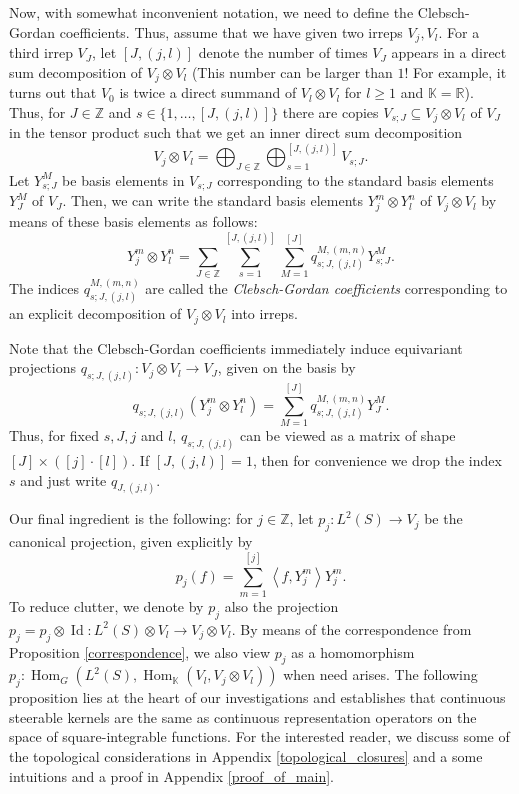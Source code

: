 \documentclass[12pt, a4paper]{article}
\theoremstyle{plain}
\theoremstyle{definition}
\theoremstyle{remark}
\newcommand{\Z}{\mathds{Z}}
\newcommand{\R}{\mathds{R}}
\newcommand{\K}{\mathds{K}}
\DeclareMathOperator{\Hom}{Hom}
\DeclareMathOperator{\Id}{Id}
\begin{document}
Now, with somewhat inconvenient notation, we need to define the Clebsch-Gordan coefficients. Thus, assume that we have given two irreps $V_j, V_l$. For a third irrep $V_J$, let $[J,(j,l)]$ denote the number of times $V_J$ appears in a direct sum decomposition of $V_j \otimes V_l$ (This number can be larger than $1$! For example, it turns out that $V_0$ is twice a direct summand of $V_l \otimes V_l$ for $l \geq 1$ and $\K = \R$). Thus, for $J \in \Z$ and $s \in \{1, \dots, [J,(j,l)]\}$ there are copies $V_{s;J} \subseteq V_j \otimes V_l$ of $V_J$ in the tensor product such that we get an inner direct sum decomposition
\begin{equation*}
V_j \otimes V_l = \bigoplus_{J \in \Z} \bigoplus_{s = 1}^{[J,(j,l)]} V_{s;J}.
\end{equation*}
Let $Y_{s;J}^M$ be basis elements in $V_{s;J}$ corresponding to the standard basis elements $Y_{J}^M$ of $V_J$. Then, we can write the standard basis elements $Y_j^m \otimes Y_l^n$ of $V_j \otimes V_l$ by means of these basis elements as follows:
\begin{equation*}
Y_j^m \otimes Y_l^n = \sum_{J \in \Z} \sum_{s = 1}^{[J, (j,l) ]} \sum_{M = 1}^{[J]} q^{M,(m,n)}_{s; J, (j,l)}Y^M_{s; J}.
\end{equation*}
The indices $q^{M,(m,n)}_{s; J, (j,l)}$ are called the \emph{Clebsch-Gordan coefficients} corresponding to an explicit decomposition of $V_j \otimes V_l$ into irreps.

Note that the Clebsch-Gordan coefficients immediately induce equivariant projections $q_{s; J, (j,l)}: V_j \otimes V_l \to V_J$, given on the basis by
\begin{equation*}
q_{s; J, (j,l)}(Y_j^m \otimes Y_l^n) = \sum_{M = 1}^{[J]} q^{M,(m,n)}_{s; J, (j,l)} Y_J^{M}.
\end{equation*}
Thus, for fixed $s,J,j$ and $l$, $q_{s;J,(j,l)}$ can be viewed as a matrix of shape $[J]\times ([j]\cdot [l])$. If $[J,(j,l)] = 1$, then for convenience we drop the index $s$ and just write $q_{J,(j,l)}$.

Our final ingredient is the following: for $j \in \Z$, let $p_j: L^2(S) \to V_j$ be the canonical projection, given explicitly by
\begin{equation*}
p_j(f) = \sum_{m = 1}^{[j]} \left\langle  f, Y_j^m \right\rangle Y_j^m.
\end{equation*}
To reduce clutter, we denote by $p_j$ also the projection $p_j = p_j \otimes \Id: L^2(S) \otimes V_l \to V_j \otimes V_l$. By means of the correspondence from Proposition \ref{correspondence}, we also view $p_j$ as a homomorphism $p_j: \Hom_G(L^2(S), \Hom_\K(V_l, V_j \otimes V_l))$ when need arises. The following proposition lies at the heart of our investigations and establishes that continuous steerable kernels are the same as continuous representation operators on the space of square-integrable functions. For the interested reader, we discuss some of the topological considerations in Appendix \ref{topological_closures} and a some intuitions and a proof in Appendix \ref{proof_of_main}.
\end{document}
